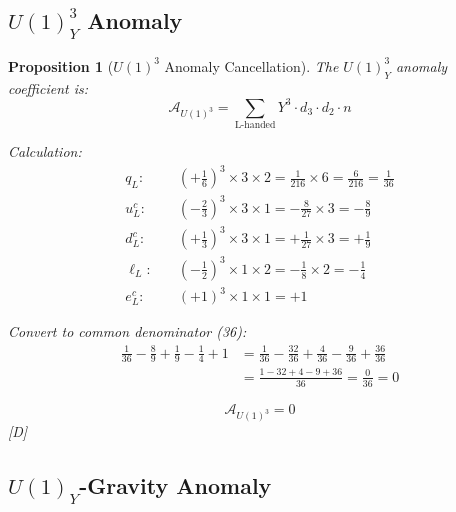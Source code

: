 \documentclass[11pt,a4paper]{article}
\newtheorem{proposition}[theorem]{Proposition}
\newcommand{\tagD}{\textcolor{blue!70!black}{[D]}}
\begin{document}
\subsection{$U(1)_Y^3$ Anomaly}

\begin{proposition}[$U(1)^3$ Anomaly Cancellation]
\label{prop:u1-3-anomaly}
The $U(1)_Y^3$ anomaly coefficient is:
\begin{equation}
\label{eq:u1-3-def}
\mathcal{A}_{U(1)^3} = \sum_{\text{L-handed}} Y^3 \cdot d_3 \cdot d_2 \cdot n
\end{equation}

Calculation:
\begin{align}
\label{eq:u1-3-qL}
q_L: \quad & (+\frac{1}{6})^3 \times 3 \times 2 = \frac{1}{216} \times 6 = \frac{6}{216} = \frac{1}{36} \\
\label{eq:u1-3-uLc}
u_L^c: \quad & (-\frac{2}{3})^3 \times 3 \times 1 = -\frac{8}{27} \times 3 = -\frac{8}{9} \\
\label{eq:u1-3-dLc}
d_L^c: \quad & (+\frac{1}{3})^3 \times 3 \times 1 = +\frac{1}{27} \times 3 = +\frac{1}{9} \\
\label{eq:u1-3-lL}
\ell_L: \quad & (-\frac{1}{2})^3 \times 1 \times 2 = -\frac{1}{8} \times 2 = -\frac{1}{4} \\
\label{eq:u1-3-eLc}
e_L^c: \quad & (+1)^3 \times 1 \times 1 = +1
\end{align}

Convert to common denominator (36):
\begin{align}
\label{eq:u1-3-common}
\frac{1}{36} - \frac{8}{9} + \frac{1}{9} - \frac{1}{4} + 1 &= \frac{1}{36} - \frac{32}{36} + \frac{4}{36} - \frac{9}{36} + \frac{36}{36} \\
\label{eq:u1-3-sum}
&= \frac{1 - 32 + 4 - 9 + 36}{36} = \frac{0}{36} = 0
\end{align}

\begin{equation}
\label{eq:u1-3-total}
\boxed{\mathcal{A}_{U(1)^3} = 0}
\end{equation}
\tagD
\end{proposition}

\subsection{$U(1)_Y$-Gravity Anomaly}
\end{document}
